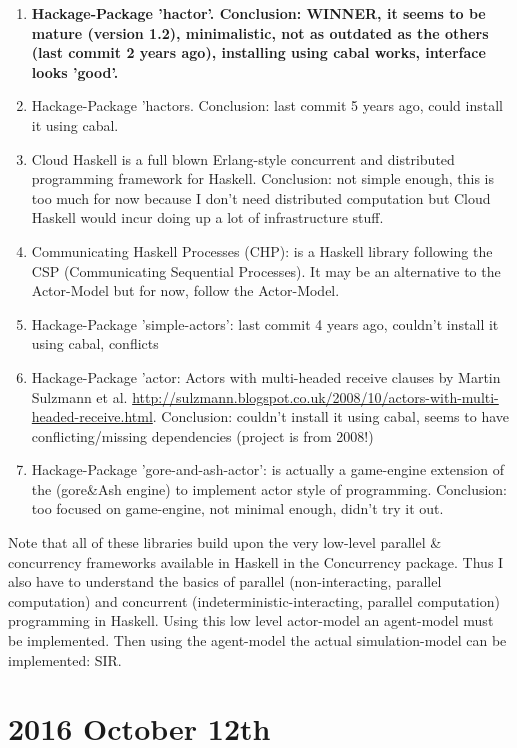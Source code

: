 \begin{enumerate}
\item \textbf{Hackage-Package 'hactor'. Conclusion: WINNER, it seems to be mature (version 1.2), minimalistic, not as outdated as the others (last commit 2 years ago), installing using cabal works, interface looks 'good'.}
\item Hackage-Package 'hactors. Conclusion: last commit 5 years ago, could install it using cabal.
\item Cloud Haskell is a full blown Erlang-style concurrent and distributed programming framework for Haskell. Conclusion: not simple enough, this is too much for now because I don't need distributed computation but Cloud Haskell would incur doing up a lot of infrastructure stuff.
\item Communicating Haskell Processes (CHP): is a Haskell library following the CSP (Communicating Sequential Processes). It may be an alternative to the Actor-Model but for now, follow the Actor-Model.
\item Hackage-Package 'simple-actors': last commit 4 years ago, couldn't install it using cabal, conflicts
\item Hackage-Package 'actor: Actors with multi-headed receive clauses by Martin Sulzmann et al. \url{http://sulzmann.blogspot.co.uk/2008/10/actors-with-multi-headed-receive.html}. Conclusion: couldn't install it using cabal, seems to have conflicting/missing dependencies (project is from 2008!)
\item Hackage-Package 'gore-and-ash-actor': is actually a game-engine extension of the (gore\&Ash engine) to implement actor style of programming. Conclusion: too focused on game-engine, not minimal enough, didn't try it out.
\end{enumerate}

Note that all of these libraries build upon the very low-level parallel \& concurrency frameworks available in Haskell in the Concurrency package. Thus I also have to understand the basics of parallel (non-interacting, parallel computation) and concurrent (indeterministic-interacting, parallel computation) programming in Haskell. Using this low level actor-model an agent-model must be implemented. Then using the agent-model the actual simulation-model can be implemented: SIR.

\section*{2016 October 12th}

